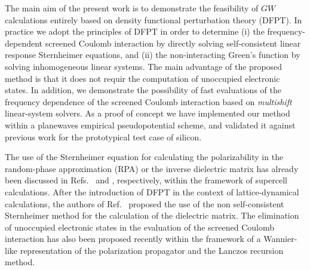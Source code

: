\documentclass[twocolumn,prb,showpacs,superscriptaddress]{revtex4}
\begin{document}
The main aim of the present work is to demonstrate the feasibility of $GW$ calculations
entirely based on density functional perturbation theory (DFPT).\cite{baroni.rmp}
In practice we adopt the principles of DFPT in order to determine (i)
the frequency-dependent screened Coulomb interaction
by directly solving self-consistent linear response Sternheimer equations,
and (ii) the non-interacting Green's function by solving
inhomogeneous linear systems. The main advantage of the proposed method 
is that it does not requir the computation of unoccupied electronic states.
In addition, we demonstrate the possibility of fast evaluations of 
the frequency dependence of the screened Coulomb interaction
based on {\it multishift} linear-system solvers.\cite{frommer}
%
As a proof of concept we have implemented our method within
a planewaves empirical pseudopotential scheme,\cite{cohen_berg} 
and validated it against previous work for the prototypical test case of silicon.

The use of the Sternheimer equation for calculating the polarizability
in the random-phase approximation (RPA) or the inverse dielectric matrix 
has already been discussed in Refs.\  and ,
respectively, 
within the framework of supercell calculations. After the introduction 
of DFPT in the context of lattice-dynamical calculations,\cite{giannozzi} 
the authors of Ref.\  proposed the
use of the non self-consistent Sternheimer method for the calculation
of the dielectric matrix. The elimination of unoccupied electronic states
in the evaluation of the screened Coulomb interaction has also been 
proposed recently within the framework of a Wannier-like representation
of the polarization propagator and the Lanczos recursion method.\cite{umari1,umari2}
\end{document}
